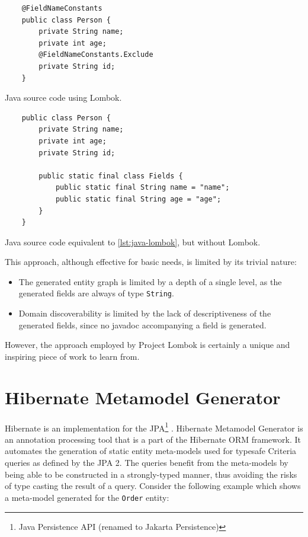 \begin{listing}[H]
    \begin{verbatim}
    @FieldNameConstants
    public class Person {
        private String name;
        private int age;
        @FieldNameConstants.Exclude
        private String id;
    }
    \end{verbatim}
    \caption{Java source code using Lombok.}\label{lst:java-lombok}
\end{listing}

\begin{listing}[H]
    \begin{verbatim}
    public class Person {
        private String name;
        private int age;
        private String id;

        public static final class Fields {
            public static final String name = "name";
            public static final String age = "age";
        }
    }
    \end{verbatim}
    \caption{Java source code equivalent to \ref{lst:java-lombok}, but without Lombok.}
    \label{lst:java-no-lombok}
\end{listing}

This approach, although effective for basic needs, is limited by its trivial nature:
\begin{itemize}
    \item The generated entity graph is limited by a depth of a single level, as the generated fields are always of type \texttt{String}.
    \item Domain discoverability is limited by the lack of descriptiveness of the generated fields, since no javadoc accompanying a field is generated.
\end{itemize}

However, the approach employed by Project Lombok is certainly a unique and inspiring piece of work to learn from.

\section{Hibernate Metamodel Generator}
Hibernate is an implementation for the JPA\footnote{Java Persistence API (renamed to Jakarta Persistence)} \cite{jpa}. Hibernate Metamodel Generator \cite{hmg} is an annotation processing tool that is a part of the Hibernate ORM framework.
It automates the generation of static entity meta-models used for typesafe Criteria queries as defined by the JPA 2.
The queries benefit from the meta-models by being able to be constructed in a strongly-typed manner, thus avoiding the risks of type casting the result of a query.
Consider the following example which shows a meta-model generated for the \texttt{Order} entity:

